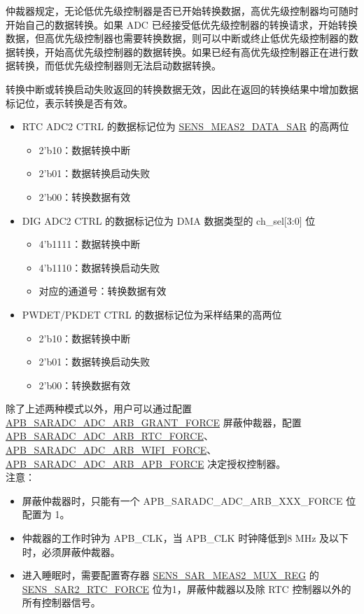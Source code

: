 \documentclass[main\_\_CN.tex]{subfiles}
\begin{document}
仲裁器规定，无论低优先级控制器是否已开始转换数据，高优先级控制器均可随时开始自己的数据转换。如果 ADC 已经接受低优先级控制器的转换请求，开始转换数据，但高优先级控制器也需要转换数据，则可以中断或终止低优先级控制器的数据转换，开始高优先级控制器的数据转换。如果已经有高优先级控制器正在进行数据转换，而低优先级控制器则无法启动数据转换。

转换中断或转换启动失败返回的转换数据无效，因此在返回的转换结果中增加数据标记位，表示转换是否有效。

\begin{itemize}
    \item RTC ADC2 CTRL 的数据标记位为 \hyperref[fielddesc:SENSMEAS2DATASAR]{SENS\_MEAS2\_DATA\_SAR} 的高两位
    \begin{itemize}
        \item 2'b10：数据转换中断
        \item 2'b01：数据转换启动失败
        \item 2'b00：转换数据有效
    \end{itemize}
    \item DIG ADC2 CTRL 的数据标记位为 DMA 数据类型的 ch\_sel[3:0] 位
    \begin{itemize}
        \item 4'b1111：数据转换中断
        \item 4'b1110：数据转换启动失败
        \item 对应的通道号：转换数据有效
    \end{itemize}
    \item PWDET/PKDET CTRL 的数据标记位为采样结果的高两位

    \begin{itemize}
        \item 2'b10：数据转换中断
        \item 2'b01：数据转换启动失败
        \item 2'b00：转换数据有效
    \end{itemize}
\end{itemize}
除了上述两种模式以外，用户可以通过配置 \hyperref[fielddesc:APBSARADCADCARBGRANTFORCE]{APB\_SARADC\_ADC\_ARB\_GRANT\_FORCE} 屏蔽仲裁器，配置 \hyperref[fielddesc:APBSARADCADCARBRTCFORCE]{APB\_SARADC\_ADC\_ARB\_RTC\_FORCE}、\hyperref[fielddesc:APBSARADCADCARBWIFIFORCE]{APB\_SARADC\_ADC\_ARB\_WIFI\_FORCE}、\hyperref[fielddesc:APBSARADCADCARBAPBFORCE]{APB\_SARADC\_ADC\_ARB\_APB\_FORCE} 决定授权控制器。\\

注意：
\begin{itemize}
    \item 屏蔽仲裁器时，只能有一个 APB\_SARADC\_ADC\_ARB\_XXX\_FORCE 位配置为 1。
    \item 仲裁器的工作时钟为 APB\_CLK，当 APB\_CLK 时钟降低到8 MHz 及以下时，必须屏蔽仲裁器。
    \item 进入睡眠时，需要配置寄存器 \hyperref[regdesc:SENSSARMEAS2MUXREG]{SENS\_SAR\_MEAS2\_MUX\_REG} 的 \hyperref[fielddesc:SENSSAR2RTCFORCE]{SENS\_SAR2\_RTC\_FORCE} 位为1，屏蔽仲裁器以及除 RTC 控制器以外的所有控制器信号。
\end{itemize}
\end{document}
